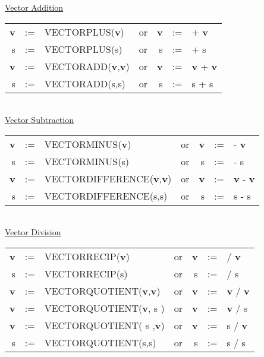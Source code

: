 \underline{Vector Addition} \\
\begin{tabular}{rclcrcl}
{\bf v} &:=& VECTORPLUS({\bf v})  &{\rm or}& {\bf v} &:=&  +  {\bf v} \\
     s  &:=& VECTORPLUS(s)  &{\rm or} &      s  &:=&  +       s  \\
{\bf v} &:=& VECTORADD({\bf v},{\bf v})  &{\rm or }& {\bf v} &:=&
{\bf v} +  {\bf v} \\
     s  &:=& VECTORADD(s,s)  &{\rm or }&      s  &:=&  s + s \\
\end{tabular} \\

\underline{Vector Subtraction} \\
\begin{tabular}{rclcrcl}
{\bf v} &:=& VECTORMINUS({\bf v})  &{\rm or}&
 {\bf v} &:=&  -  {\bf v} \\
 s  &:=& VECTORMINUS(s)  &{\rm or} &      s  &:=&  -       s  \\
{\bf v} &:=& VECTORDIFFERENCE({\bf v},{\bf v})  &{\rm or }& {\bf v} &:=&
  {\bf v} -  {\bf v} \\
 s  &:=& VECTORDIFFERENCE(s,s)  &{\rm or }&      s  &:=&  s - s \\
\end{tabular} \\

\underline{Vector Division}\\
\begin{tabular}{rclcrcl}
{\bf v} &:=& VECTORRECIP({\bf v})  &{\rm or}& {\bf v} &:=&  /
{\bf v} \\
 s  &:=& VECTORRECIP(s)  &{\rm or} &      s  &:=&  /       s  \\
{\bf v} &:=& VECTORQUOTIENT({\bf v},{\bf v})  &{\rm or }& {\bf v} &:=&
{\bf v} /  {\bf v} \\
{\bf v} &:=& VECTORQUOTIENT({\bf v},    s  )  &{\rm or }& {\bf v} &:=&
{\bf v} /     s    \\
{\bf v} &:=& VECTORQUOTIENT(   s   ,{\bf v})  &{\rm or }& {\bf v} &:=&
   s    /  {\bf v} \\
     s  &:=& VECTORQUOTIENT(s,s)  &{\rm or }&      s  &:=&  s / s
       \\
\end{tabular} \\

